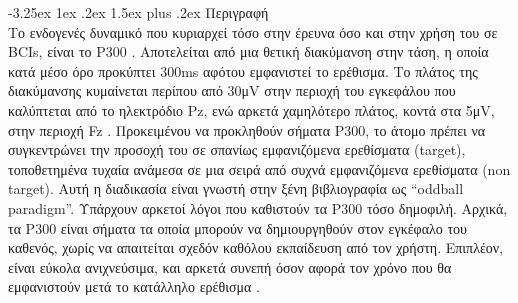 \documentclass[11pt,a4paper,english,greek,twoside]{../Thesis}
\makeatletter
\renewcommand\paragraph{\@startsection{paragraph}{4}{\z@}%
                                    {-3.25ex \@plus1ex \@minus.2ex}%
                                    {1.5ex plus .2ex}%
                                    {\normalfont\normalsize\bfseries}}
\makeatother
\begin{document}
      \paragraph{Περιγραφή} ~\\
      Το ενδογενές δυναμικό που κυριαρχεί τόσο στην έρευνα όσο και στην χρήση του σε BCIs, είναι το P300 \cite{Gordeev2007-pu}. Αποτελείται από μια θετική διακύμανση στην τάση, η οποία κατά μέσο όρο προκύπτει 300ms αφότου εμφανιστεί το ερέθισμα. Το πλάτος της διακύμανσης κυμαίνεται περίπου από 30μV στην περιοχή του εγκεφάλου που καλύπτεται από το ηλεκτρόδιο Pz, ενώ αρκετά χαμηλότερο πλάτος, κοντά στα 5μV, στην περιοχή Fz \cite{Perlman2013-sg}. Προκειμένου να προκληθούν σήματα P300, το άτομο πρέπει να συγκεντρώνει την προσοχή του σε σπανίως εμφανιζόμενα ερεθίσματα (target), τοποθετημένα τυχαία ανάμεσα σε μια σειρά από συχνά εμφανιζόμενα ερεθίσματα (non target). Αυτή η διαδικασία είναι γνωστή στην ξένη βιβλιογραφία ως “oddball paradigm”. Υπάρχουν αρκετοί λόγοι που καθιστούν τα P300 τόσο δημοφιλή. Αρχικά, τα P300 είναι σήματα τα οποία μπορούν να δημιουργηθούν στον εγκέφαλο του καθενός, χωρίς να απαιτείται σχεδόν καθόλου εκπαίδευση από τον χρήστη. Επιπλέον, είναι εύκολα ανιχνεύσιμα, και αρκετά συνεπή όσον αφορά τον χρόνο που θα εμφανιστούν μετά το κατάλληλο ερέθισμα \cite{Fazel-Rezai2012-mk}. 
      
\end{document}
